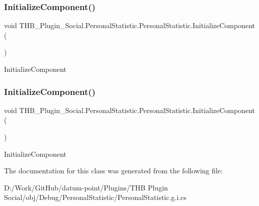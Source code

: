 \subsubsection{\texorpdfstring{Initialize\+Component()}{InitializeComponent()}\hspace{0.1cm}{\footnotesize\ttfamily [1/2]}}
{\footnotesize\ttfamily void T\+H\+B\+\_\+\+Plugin\+\_\+\+Social.\+Personal\+Statistic.\+Personal\+Statistic.\+Initialize\+Component (\begin{DoxyParamCaption}{ }\end{DoxyParamCaption})}



Initialize\+Component 

\mbox{\label{class_t_h_b___plugin___social_1_1_personal_statistic_1_1_personal_statistic_accd1054e342a7f08b35fea1e39378bf3}} 
\subsubsection{\texorpdfstring{Initialize\+Component()}{InitializeComponent()}\hspace{0.1cm}{\footnotesize\ttfamily [2/2]}}
{\footnotesize\ttfamily void T\+H\+B\+\_\+\+Plugin\+\_\+\+Social.\+Personal\+Statistic.\+Personal\+Statistic.\+Initialize\+Component (\begin{DoxyParamCaption}{ }\end{DoxyParamCaption})}



Initialize\+Component 



The documentation for this class was generated from the following file\+:\begin{DoxyCompactItemize}
\item 
D\+:/\+Work/\+Git\+Hub/datum-\/point/\+Plugins/\+T\+H\+B Plugin Social/obj/\+Debug/\+Personal\+Statistic/Personal\+Statistic.\+g.\+i.\+cs\end{DoxyCompactItemize}
